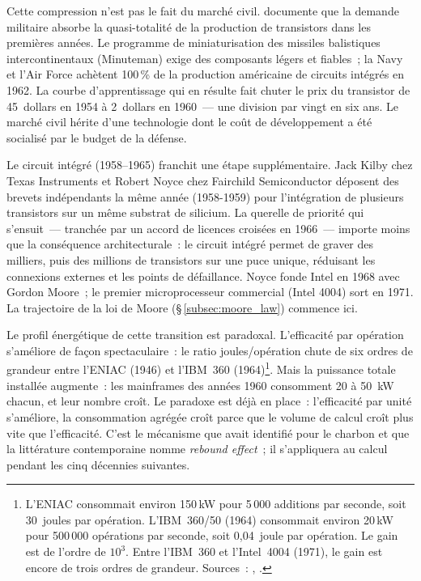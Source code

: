 %
Cette compression n'est pas le fait du marché civil. \textcite{flamm_creating_1988} documente que la demande militaire absorbe la quasi-totalité de la production de transistors dans les premières années. Le programme de miniaturisation des missiles balistiques intercontinentaux (Minuteman) exige des composants légers et fiables~; la Navy et l'Air Force achètent 100\,\% de la production américaine de circuits intégrés en 1962. La courbe d'apprentissage qui en résulte fait chuter le prix du transistor de 45~dollars en 1954 à 2~dollars en 1960~--- une division par vingt en six ans. Le marché civil hérite d'une technologie dont le coût de développement a été socialisé par le budget de la défense.

%
Le circuit intégré (1958--1965) franchit une étape supplémentaire. Jack Kilby chez Texas Instruments et Robert Noyce chez Fairchild Semiconductor déposent des brevets indépendants la même année (1958-1959) pour l'intégration de plusieurs transistors sur un même substrat de silicium. La querelle de priorité qui s'ensuit~--- tranchée par un accord de licences croisées en 1966~--- importe moins que la conséquence architecturale~: le circuit intégré permet de graver des milliers, puis des millions de transistors sur une puce unique, réduisant les connexions externes et les points de défaillance. Noyce fonde Intel en 1968 avec Gordon Moore~; le premier microprocesseur commercial (Intel 4004) sort en 1971. La trajectoire de la loi de Moore (§\,\ref{subsec:moore_law}) commence ici.

%
Le profil énergétique de cette transition est paradoxal. L'efficacité par opération s'améliore de façon spectaculaire~: le ratio joules/opération chute de six ordres de grandeur entre l'ENIAC (1946) et l'IBM~360 (1964)\footnote{L'ENIAC consommait environ 150\,kW pour 5\,000 additions par seconde, soit 30~joules par opération. L'IBM~360/50 (1964) consommait environ 20\,kW pour 500\,000 opérations par seconde, soit 0,04~joule par opération. Le gain est de l'ordre de $10^{3}$. Entre l'IBM~360 et l'Intel~4004 (1971), le gain est encore de trois ordres de grandeur. Sources~: \textcite{nordhaus_two_2007}, \textcite{koomey_implications_2011}.}. Mais la puissance totale installée augmente~: les mainframes des années 1960 consomment 20 à 50~kW chacun, et leur nombre croît. Le paradoxe est déjà en place~: l'efficacité par unité s'améliore, la consommation agrégée croît parce que le volume de calcul croît plus vite que l'efficacité. C'est le mécanisme que \textcite{jevons_coal_1865} avait identifié pour le charbon et que la littérature contemporaine nomme \emph{rebound effect}~; il s'appliquera au calcul pendant les cinq décennies suivantes.


